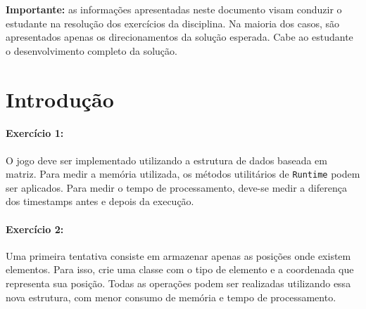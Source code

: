 \newcommand{\templatesdir}{../../../templates}
\newcommand{\template}{template-material}


\newcommand{\initials}{45EST}
\newcommand{\discipline}{Algoritmos e Estruturas de Dados}
\newcommand{\doctitle}{Guia para os exercícios}
\newcommand{\myname}{Prof. Marcelo de Souza}
\newcommand{\university}{Universidade do Estado de Santa Catarina}
\newcommand{\campus}{Centro de Educação Superior do Alto Vale do Itajaí}
\newcommand{\department}{Departamento de Engenharia de Software}
\newcommand{\exercisedescription}{Exercício}

\usepackage{listings}

\setlength{\parskip}{0.3em}


	
\inserttitle

\textbf{Importante:} as informações apresentadas neste documento visam conduzir o estudante na resolução dos exercícios da disciplina. Na maioria dos casos, são apresentados apenas os direcionamentos da solução esperada. Cabe ao estudante o desenvolvimento completo da solução.

\section{Introdução}

\paragraph{Exercício 1:}
O jogo deve ser implementado utilizando a estrutura de dados baseada em matriz. Para medir a memória utilizada, os métodos utilitários de \texttt{Runtime} podem ser aplicados. Para medir o tempo de processamento, deve-se medir a diferença dos timestamps antes e depois da execução.

\paragraph{Exercício 2:}
Uma primeira tentativa consiste em armazenar apenas as posições onde existem elementos. Para isso, crie uma classe com o tipo de elemento e a coordenada que representa sua posição. Todas as operações podem ser realizadas utilizando essa nova estrutura, com menor consumo de memória e tempo de processamento.

